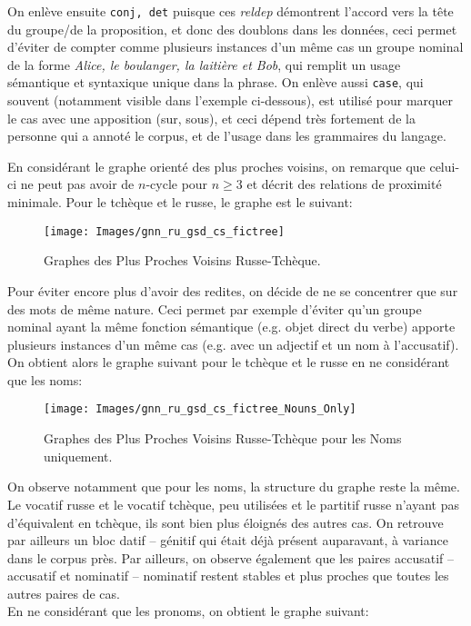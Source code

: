 \documentclass{article}
\begin{document}
On enlève ensuite \texttt{conj, det} puisque ces \textit{reldep} démontrent l'accord vers la tête du groupe/de la proposition, et donc des doublons dans les données, ceci permet d'éviter de compter comme plusieurs instances d'un même cas un groupe nominal de la forme \emph{Alice, le boulanger, la laitière et Bob}, qui remplit un usage sémantique et syntaxique unique dans la phrase.
On enlève aussi \texttt{case}, qui souvent (notamment visible dans l'exemple ci-dessous), est utilisé pour marquer le cas avec une apposition (sur, sous), et ceci dépend très fortement de la personne qui a annoté le corpus, et de l'usage dans les grammaires du langage.\\
\medskip

En considérant le graphe orienté des plus proches voisins, on remarque que celui-ci ne peut pas avoir de $n$-cycle pour $n \geq 3$ et décrit des relations de proximité minimale.
Pour le tchèque et le russe, le graphe est le suivant:

\begin{figure}[h]
        \centering
        \texttt{[image: Images/gnn\_ru\_gsd\_cs\_fictree]}
        \caption{Graphes des Plus Proches Voisins Russe-Tchèque.}
\end{figure}

Pour éviter encore plus d'avoir des redites, on décide de ne se concentrer que sur des mots de même nature.
Ceci permet par exemple d'éviter qu'un groupe nominal ayant la même fonction sémantique (e.g. objet direct du verbe) apporte plusieurs instances d'un même cas (e.g. avec un adjectif et un nom à l'accusatif).
On obtient alors le graphe suivant pour le tchèque et le russe en ne considérant que les noms:

\begin{figure}[h]
        \centering
        \texttt{[image: Images/gnn\_ru\_gsd\_cs\_fictree\_Nouns\_Only]}
        \caption{Graphes des Plus Proches Voisins Russe-Tchèque pour les Noms uniquement.}
\end{figure}

On observe notamment que pour les noms, la structure du graphe reste la même.
Le vocatif russe et le vocatif tchèque, peu utilisées et le partitif russe n'ayant pas d'équivalent en tchèque, ils sont bien plus éloignés des autres cas.
On retrouve par ailleurs un bloc datif -- génitif qui était déjà présent auparavant, à variance dans le corpus près.
Par ailleurs, on observe également que les paires accusatif -- accusatif et nominatif -- nominatif restent stables et plus proches que toutes les autres paires de cas.\\
En ne considérant que les pronoms, on obtient le graphe suivant:
\end{document}
